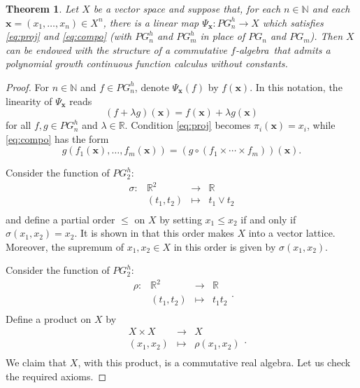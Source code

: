 \documentclass{amsart}
\theoremstyle{plain}
\newtheorem{thm}{Theorem}[section]
\theoremstyle{definition}
\theoremstyle{remark}
\newcommand\N{\ensuremath{\mathbb{N}}}
\newcommand\R{\ensuremath{\mathbb{R}}}
\newcommand{\falg}{$f\!$-algebra}
\newcommand{\Psx}{\Psi_{\bm x}}
\begin{document}
\begin{thm}\label{thm:vspace}
    Let $X$ be a vector space and suppose that, for each $n \in \N$
    and each $\bm x = (x_1,\ldots ,x_n)\in X^{n}$, there is a linear
    map $\Psx\colon PG_n^{h}\to X$ which satisfies \eqref{eq:proj} and
    \eqref{eq:compo} (with $PG_n^{h}$ and $PG_m^{h}$ in place of
    $PG_n$ and $PG_m$). Then $X$
    can be endowed with the structure of a commutative \falg\ that
    admits a polynomial growth continuous function
    calculus without constants.
\end{thm}
\begin{proof}
    For $n \in \N$ and $f \in PG_n^{h}$, denote $\Psx(f)$ by $f(\bm x)$. In this
    notation, the linearity of $\Psx$ reads
    \[
        (f+\lambda g)(\bm x)=f(\bm x)+\lambda g(\bm x)
    \]
    for all $f,g \in PG_n^{h}$ and $\lambda \in \R$. Condition
    \eqref{eq:proj}
    becomes $\pi _i(\bm x)=x_i$, while \eqref{eq:compo} has the form
    \[
    g(f_1(\bm x),\ldots ,f_m(\bm x))=(g\circ (f_1\times \cdots \times
    f_m))(\bm x).
    \]

    Consider the function of $PG_2^{h}$:
    \[
    \begin{array}{cccc}
    \sigma \colon& \R^2 & \longrightarrow & \R \\
            & (t_1,t_2) & \longmapsto & t_1\vee t_2 \\
    \end{array}
    \]
    and define a partial order $\le $ on $X$ by setting $x_1\le x_2$
    if and only if $\sigma (x_1,x_2)=x_2$. It is shown in
    \cite[Theorem 1.4]{laustsen_troitsky2020} that this order makes
    $X$ into a vector lattice. Moreover, the supremum of $x_1,x_2 \in
    X$ in this order is given by $\sigma (x_1,x_2)$.

    Consider the function of $PG_2^{h}$:
    \[
    \begin{array}{cccc}
    \rho \colon& \R^2 & \longrightarrow & \R \\
            & (t_1,t_2) & \longmapsto & t_1t_2 \\
    \end{array}.
    \]
    Define a product on $X$ by
    \[
    \begin{array}{cccc}
            & X\times X & \longrightarrow & X \\
            & (x_1,x_2) & \longmapsto & \rho (x_1,x_2) \\
    \end{array}.
    \]
    We claim that $X$, with this product, is a commutative real
    algebra. Let us check the required axioms.


\end{proof}
\end{document}
